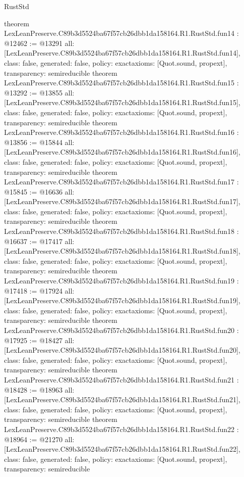 \begin{lexlean}{RustStd}
\begin{coremodule}
{}
theorem LexLeanPreserve.C89b3d5524ba67f57cb26dbb1da158164.R1.RustStd.fun14 : @12462 := @13291 {
  all: [LexLeanPreserve.C89b3d5524ba67f57cb26dbb1da158164.R1.RustStd.fun14],
  class: false,
  generated: false,
  policy: exact{axioms: [Quot.sound, propext]},
  transparency: semireducible
}
theorem LexLeanPreserve.C89b3d5524ba67f57cb26dbb1da158164.R1.RustStd.fun15 : @13292 := @13855 {
  all: [LexLeanPreserve.C89b3d5524ba67f57cb26dbb1da158164.R1.RustStd.fun15],
  class: false,
  generated: false,
  policy: exact{axioms: [Quot.sound, propext]},
  transparency: semireducible
}
theorem LexLeanPreserve.C89b3d5524ba67f57cb26dbb1da158164.R1.RustStd.fun16 : @13856 := @15844 {
  all: [LexLeanPreserve.C89b3d5524ba67f57cb26dbb1da158164.R1.RustStd.fun16],
  class: false,
  generated: false,
  policy: exact{axioms: [Quot.sound, propext]},
  transparency: semireducible
}
theorem LexLeanPreserve.C89b3d5524ba67f57cb26dbb1da158164.R1.RustStd.fun17 : @15845 := @16636 {
  all: [LexLeanPreserve.C89b3d5524ba67f57cb26dbb1da158164.R1.RustStd.fun17],
  class: false,
  generated: false,
  policy: exact{axioms: [Quot.sound, propext]},
  transparency: semireducible
}
theorem LexLeanPreserve.C89b3d5524ba67f57cb26dbb1da158164.R1.RustStd.fun18 : @16637 := @17417 {
  all: [LexLeanPreserve.C89b3d5524ba67f57cb26dbb1da158164.R1.RustStd.fun18],
  class: false,
  generated: false,
  policy: exact{axioms: [Quot.sound, propext]},
  transparency: semireducible
}
theorem LexLeanPreserve.C89b3d5524ba67f57cb26dbb1da158164.R1.RustStd.fun19 : @17418 := @17924 {
  all: [LexLeanPreserve.C89b3d5524ba67f57cb26dbb1da158164.R1.RustStd.fun19],
  class: false,
  generated: false,
  policy: exact{axioms: [Quot.sound, propext]},
  transparency: semireducible
}
theorem LexLeanPreserve.C89b3d5524ba67f57cb26dbb1da158164.R1.RustStd.fun20 : @17925 := @18427 {
  all: [LexLeanPreserve.C89b3d5524ba67f57cb26dbb1da158164.R1.RustStd.fun20],
  class: false,
  generated: false,
  policy: exact{axioms: [Quot.sound, propext]},
  transparency: semireducible
}
theorem LexLeanPreserve.C89b3d5524ba67f57cb26dbb1da158164.R1.RustStd.fun21 : @18428 := @18963 {
  all: [LexLeanPreserve.C89b3d5524ba67f57cb26dbb1da158164.R1.RustStd.fun21],
  class: false,
  generated: false,
  policy: exact{axioms: [Quot.sound, propext]},
  transparency: semireducible
}
theorem LexLeanPreserve.C89b3d5524ba67f57cb26dbb1da158164.R1.RustStd.fun22 : @18964 := @21270 {
  all: [LexLeanPreserve.C89b3d5524ba67f57cb26dbb1da158164.R1.RustStd.fun22],
  class: false,
  generated: false,
  policy: exact{axioms: [Quot.sound, propext]},
  transparency: semireducible
}
\end{coremodule}
\end{lexlean}

